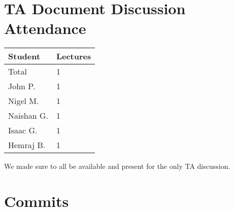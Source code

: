 \documentclass{article}
\begin{document}
\newpage
\section{TA Document Discussion Attendance}


\begin{table}[H]
\centering
\begin{tabular}{ll}
\toprule
\textbf{Student} & \textbf{Lectures}\\
\midrule
Total & 1\\
John P. & 1\\
Nigel M. & 1\\
Naishan G. & 1\\
Isaac G. & 1\\
Hemraj B. & 1\\
\bottomrule
\end{tabular}
\end{table}

We made sure to all be available and present for the only TA discussion.


\newpage
\section{Commits}



\pgfmathsetmacro{\CT}{\CJ + \CN + \CNS + \CH + \CI}

\end{document}
